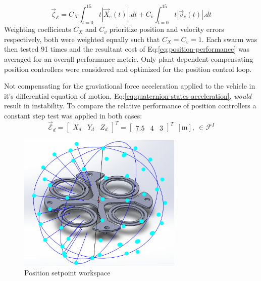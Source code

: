 \begin{equation}\label{eq:position-performance}
\vec{\zeta}_{\mathcal{E}}=C_{X}\int_{t=0}^{15}t|\vec{X}_e(t)|.dt+C_{v}\int_{t=0}^{15}t|\vec{v}_e(t)|.dt
\end{equation}
Weighting coefficients $C_X$ and $C_v$ prioritize position and velocity errors respectively, both were weighted equally such that $C_X=C_v=1$. Each swarm was then tested 91 times and the resultant cost of Eq:\ref{eq:position-performance} was averaged for an overall performance metric. Only plant dependent compensating position controllers were considered and optimized for the position control loop.
\par
Not compensating for the graviational force acceleration applied to the vehicle in it's differential equation of motion, Eq:\ref{eq:quaternion-states-acceleration}, \emph{would} result in instability. To compare the relative performance of position controllers a constant step test was applied in both cases:
\begin{equation}\label{eq:position-step}
\vec{\mathcal{E}}_d=\begin{bmatrix}
X_d&
Y_d&
Z_d
\end{bmatrix}^T=\begin{bmatrix}
7.5&
4&
3
\end{bmatrix}^T~~[\text{m}],~\in\mathcal{F}^{I}
\end{equation}
\par
\begin{figure}[htbp]
\centering
\includegraphics[width=0.7\textwidth]{figs/position-setpoint}
\caption{Position setpoint workspace}
\label{fig:position-setpoint}
\end{figure}
\par
